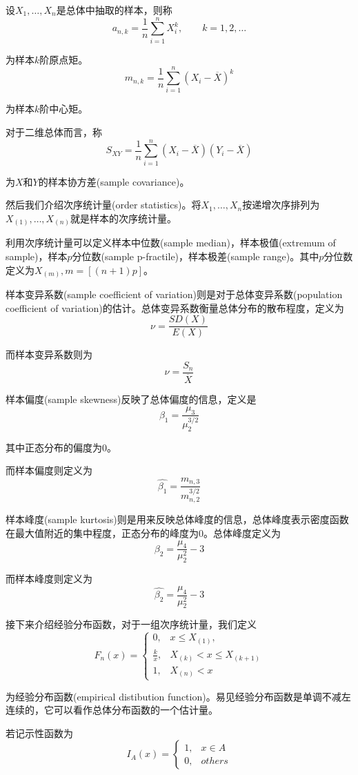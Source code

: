 \documentclass[UTF8]{ctexart}
\begin{document}
设$X_{1},\ldots ,X_{n}$是总体中抽取的样本，则称
$$a_{n,k}=\frac{1}{n}\sum_{i=1}^{n}X_{i}^{k},\qquad k=1,2,\ldots $$

为样本$k$阶原点矩。
$$m_{n,k}=\frac{1}{n}\sum_{i=1}^{n}(X_{i}-\overline{X})^{k} $$

为样本$k$阶中心矩。

对于二维总体而言，称
$$S_{XY}=\frac{1}{n}\sum_{i=1}^{n}(X_{i}-\overline{X})(Y_{i}-\overline{X}) $$

为$X$和$Y$的样本协方差(sample covariance)。

然后我们介绍次序统计量(order statistics)。将$X_{1},\ldots ,X_{n}$按递增次序排列为$X_{(1)},\ldots ,X_{(n)}$就是样本的次序统计量。

利用次序统计量可以定义样本中位数(sample median)，样本极值(extremum of sample)，样本$p$分位数(sample p-fractile)，样本极差(sample range)。其中$p$分位数定义为$X_{(m)},m=[(n+1)p]$。

样本变异系数(sample coefficient of variation)则是对于总体变异系数(population coefficient of variation)的估计。总体变异系数衡量总体分布的散布程度，定义为
$$\nu =\frac{SD(X)}{E(X)} $$

而样本变异系数则为
$$\nu = \frac{S_{n}}{\overline{X}} $$

样本偏度(sample skewness)反映了总体偏度的信息，定义是
$$\beta_{1}=\frac{\mu_{3}}{\mu_{2}^{3/2}} $$

其中正态分布的偏度为$0$。

而样本偏度则定义为
$$\hat{\beta_{1} }=\frac{m_{n,3}}{m_{n,2}^{3/2}} $$

样本峰度(sample kurtosis)则是用来反映总体峰度的信息，总体峰度表示密度函数在最大值附近的集中程度，正态分布的峰度为$0$。总体峰度定义为
$$\beta_{2}=\frac{\mu_{4}}{\mu_{2}^{2}}-3 $$

而样本峰度则定义为
$$\hat{\beta_{2}}=\frac{\mu_{4}}{\mu_{2}^{2}}-3 $$

接下来介绍经验分布函数，对于一组次序统计量，我们定义
$$F_{n}(x)=\left\{ \begin{array}{ll}
0, & x\leq X_{(1)},\\
\frac{k}{x}, & X_{(k)}<x\leq X_{(k+1)}\\
1, & X_{(n)}<x
\end{array} \right. $$

为经验分布函数(empirical distibution function)。易见经验分布函数是单调不减左连续的，它可以看作总体分布函数的一个估计量。

若记示性函数为
$$I_{A}(x)=\left\{ \begin{array}{ll}
1, & x\in A \\
0, & others
\end{array} \right. $$
\end{document}
